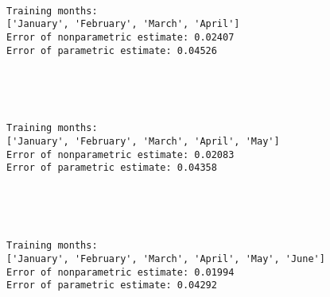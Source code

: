 \documentclass[11pt]{article}
\begin{document}
    \begin{center}
    \end{center}
    { \hspace*{\fill} \\}
    
    \begin{Verbatim}[commandchars=\\\{\}]
Training months:
['January', 'February', 'March', 'April']
Error of nonparametric estimate: 0.02407
Error of parametric estimate: 0.04526
    \end{Verbatim}

    \begin{center}
    \end{center}
    { \hspace*{\fill} \\}
    
    \begin{center}
    \end{center}
    { \hspace*{\fill} \\}
    
    \begin{Verbatim}[commandchars=\\\{\}]
Training months:
['January', 'February', 'March', 'April', 'May']
Error of nonparametric estimate: 0.02083
Error of parametric estimate: 0.04358
    \end{Verbatim}

    \begin{center}
    \end{center}
    { \hspace*{\fill} \\}
    
    \begin{center}
    \end{center}
    { \hspace*{\fill} \\}
    
    \begin{Verbatim}[commandchars=\\\{\}]
Training months:
['January', 'February', 'March', 'April', 'May', 'June']
Error of nonparametric estimate: 0.01994
Error of parametric estimate: 0.04292
    \end{Verbatim}
\end{document}
